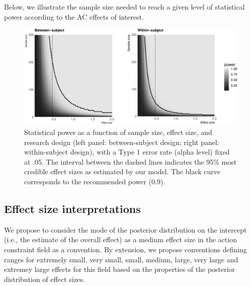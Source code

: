 \documentclass[floatsintext,doc]{apa6}
\begin{document}
Below, we illustrate the sample size needed to reach a given level of statistical power according to the AC effects of interest.

\begin{figure}
\centering
\includegraphics{supplementary_materials_files/figure-latex/power-1.pdf}
\caption{\label{fig:power}Statistical power as a function of sample size, effect size, and research design (left panel: between-subject design; right panel: within-subject design), with a Type 1 error rate (alpha level) fixed at .05. The interval between the dashed lines indicates the 95\% most credible effect sizes as estimated by our model. The black curve corresponds to the recommended power (0.9).}
\end{figure}

\hypertarget{effect-size-interpretations}{%
\subsection{Effect size interpretations}\label{effect-size-interpretations}}

We propose to consider the mode of the posterior distribution on the intercept (i.e., the estimate of the overall effect) as a medium effect size in the action constraint field as a convention. By extension, we propose conventions defining ranges for extremely small, very small, small, medium, large, very large and extremey large effects for this field based on the properties of the posterior distribution of effect sizes.
\end{document}
